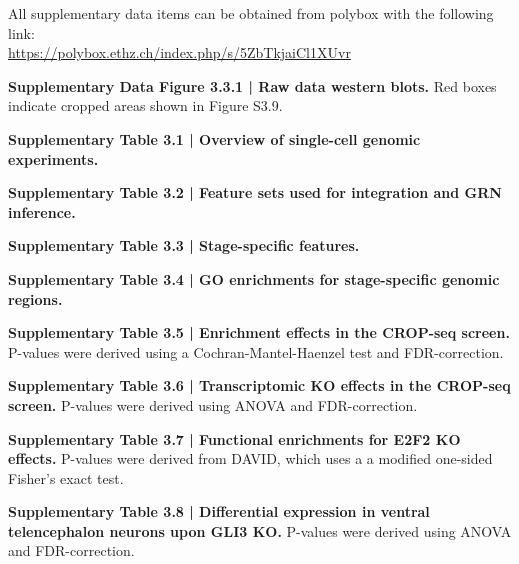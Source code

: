 \clearpage


\noindent
All supplementary data items can be obtained from polybox with the following link: \\ \href{https://polybox.ethz.ch/index.php/s/5ZbTkjaiCl1XUvr}{https://polybox.ethz.ch/index.php/s/5ZbTkjaiCl1XUvr} 

\vspace{0.5cm}
\noindent
{\normalfont\footnotesize\sffamily\textbf{Supplementary Data Figure 3.3.1 | Raw data western blots.} Red boxes indicate cropped areas shown in Figure S3.9.} 

\vspace{0.25cm}
\noindent
{\normalfont\footnotesize\sffamily\textbf{Supplementary Table 3.1 | Overview of single-cell genomic experiments.}}

\vspace{0.25cm}
\noindent
{\normalfont\footnotesize\sffamily\textbf{Supplementary Table 3.2 | Feature sets used for integration and GRN inference.}}

\vspace{0.25cm}
\noindent
{\normalfont\footnotesize\sffamily\textbf{Supplementary Table 3.3 | Stage-specific features.}}

\vspace{0.25cm}
\noindent
{\normalfont\footnotesize\sffamily\textbf{Supplementary Table 3.4 | GO enrichments for stage-specific genomic regions.}}

\vspace{0.25cm}
\noindent
{\normalfont\footnotesize\sffamily\textbf{Supplementary Table 3.5 | Enrichment effects in the CROP-seq screen. }P-values were derived using a Cochran-Mantel-Haenzel test and FDR-correction.}

\vspace{0.25cm}
\noindent
{\normalfont\footnotesize\sffamily\textbf{Supplementary Table 3.6 | Transcriptomic KO effects in the CROP-seq screen.} P-values were derived using ANOVA and FDR-correction.}

\vspace{0.25cm}
\noindent
{\normalfont\footnotesize\sffamily\textbf{Supplementary Table 3.7 | Functional enrichments for E2F2 KO effects.} P-values were derived from DAVID, which uses a a modified one-sided Fisher's exact test.}

\vspace{0.25cm}
\noindent
{\normalfont\footnotesize\sffamily\textbf{Supplementary Table 3.8 | Differential expression in ventral telencephalon neurons upon GLI3 KO.} P-values were derived using ANOVA and FDR-correction.}

